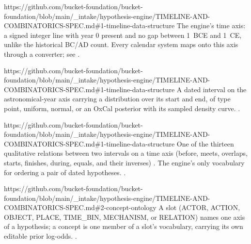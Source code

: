 %
%

\newcommand{\bktrepo}{https://github.com/bucket-foundation/bucket-foundation/blob/main}

%
  {\bktrepo/_intake/hypothesis-engine/TIMELINE-AND-COMBINATORICS-SPEC.md\#1-timeline-data-structure}%
  {The engine's time axis: a signed integer line with year 0 present and no
   gap between 1~BCE and 1~CE, unlike the historical BC/AD count. Every
   calendar system maps onto this axis through a converter; see
   .}

%
  {\bktrepo/_intake/hypothesis-engine/TIMELINE-AND-COMBINATORICS-SPEC.md\#1-timeline-data-structure}%
  {A dated interval on the astronomical-year axis carrying a distribution
   over its start and end, of type point, uniform, normal, or an OxCal
   posterior with its sampled density curve. .}

%
  {\bktrepo/_intake/hypothesis-engine/TIMELINE-AND-COMBINATORICS-SPEC.md\#1-timeline-data-structure}%
  {One of the thirteen qualitative relations between two intervals on a
   time axis (before, meets, overlaps, starts, finishes, during, equals,
   and their inverses) \autocite{allen1983interval}. The engine's only
   vocabulary for ordering a pair of dated hypotheses. .}

%
  {\bktrepo/_intake/hypothesis-engine/TIMELINE-AND-COMBINATORICS-SPEC.md\#2-concept-ontology}%
  {A slot (ACTOR, ACTION, OBJECT, PLACE, TIME\_BIN, MECHANISM, or RELATION)
   names one axis of a hypothesis; a concept is one member of a slot's
   vocabulary, carrying its own editable prior log-odds. .}

